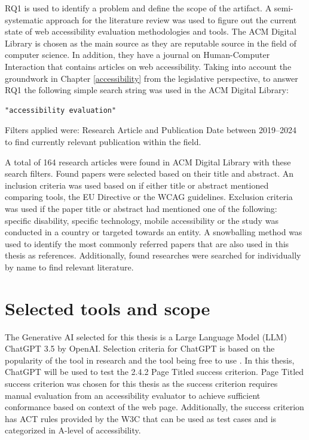 RQ1 is used to identify a problem and define the scope of the artifact. A semi-systematic approach for the literature review was used to figure out the current state of web accessibility evaluation methodologies and tools. The ACM Digital Library is chosen as the main source as they are reputable source in the field of computer science. In addition, they have a journal on Human-Computer Interaction that contains articles on web accessibility. Taking into account the groundwork in Chapter \ref{accessibility} from the legislative perspective, to answer RQ1 the following simple search string was used in the ACM Digital Library:

\begin{verbatim}
"accessibility evaluation"
\end{verbatim}

Filters applied were: Research Article and Publication Date between 2019--2024 to find currently relevant publication within the field. 

A total of 164 research articles were found in ACM Digital Library with these search filters. Found papers were selected based on their title and abstract. An inclusion criteria was used based on if either title or abstract mentioned comparing tools, the EU Directive or the WCAG guidelines. Exclusion criteria was used if the paper title or abstract had mentioned one of the following: specific disability, specific technology, mobile accessibility or the study was conducted in a country or targeted towards an entity. A snowballing method was used to identify the most commonly referred papers that are also used in this thesis as references. Additionally, found researches were searched for individually by name to find relevant literature.

\section{Selected tools and scope}

The Generative AI selected for this thesis is a Large Language Model (LLM) ChatGPT 3.5 by OpenAI. Selection criteria for ChatGPT is based on the popularity of the tool in research and the tool being free to use \citep{ouyang2023llm, white2023prompt}. In this thesis, ChatGPT will be used to test the 2.4.2 Page Titled success criterion. Page Titled success criterion was chosen for this thesis as the success criterion requires manual evaluation from an accessibility evaluator to achieve sufficient conformance based on context of the web page. Additionally, the success criterion has ACT rules provided by the W3C that can be used as test cases and is categorized in A-level of accessibility. 

